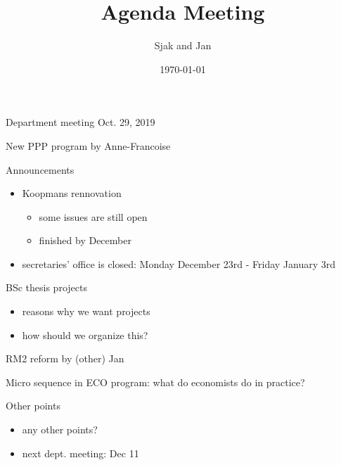 \documentclass[presentation]{beamer}
\author{Sjak and Jan}
\date{\today}
\title{Agenda Meeting}
\begin{document}
\begin{frame}[label={sec:orgf05aa03}]{Department meeting Oct. 29, 2019}
\begin{block}{New PPP program by Anne-Francoise}
\end{block}

\begin{block}{Announcements}
\begin{itemize}
\item Koopmans rennovation
\begin{itemize}
\item some issues are still open
\item finished by December
\end{itemize}
\item secretaries' office is closed: Monday December 23rd - Friday January 3rd
\end{itemize}
\end{block}

\begin{block}{BSc thesis projects}
\begin{itemize}
\item reasons why we want projects
\item how should we organize this?
\end{itemize}
\end{block}

\begin{block}{RM2 reform by (other) Jan}
\end{block}

\begin{block}{Micro sequence in ECO program: what do economists do in practice?}
\end{block}

\begin{block}{Other points}
\begin{itemize}
\item any other points?
\item next dept. meeting: Dec 11
\end{itemize}
\end{block}
\end{frame}
\end{document}
